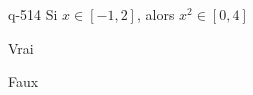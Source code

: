 \begin{truefalse}{q-514}
Si $x\in [-1,2]$, alors $x^2\in [0,4]$
\item* Vrai
\item Faux
\end{truefalse}

